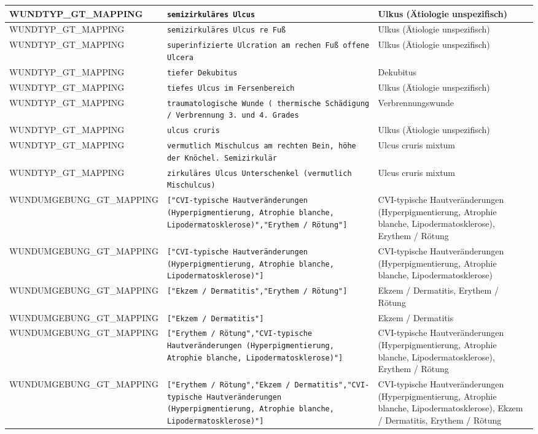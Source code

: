 \begin{longtable}{|p{3.5cm}|p{5cm}|p{6.5cm}|}
WUNDTYP\_GT\_MAPPING & \texttt{semizirkuläres Ulcus} & Ulkus (Ätiologie unspezifisch) \\ \hline
WUNDTYP\_GT\_MAPPING & \texttt{semizirkuläres Ulcus re Fuß} & Ulkus (Ätiologie unspezifisch) \\ \hline
WUNDTYP\_GT\_MAPPING & \texttt{superinfizierte Ulcration am rechen Fuß offene Ulcera} & Ulkus (Ätiologie unspezifisch) \\ \hline
WUNDTYP\_GT\_MAPPING & \texttt{tiefer Dekubitus} & Dekubitus \\ \hline
WUNDTYP\_GT\_MAPPING & \texttt{tiefes Ulcus im Fersenbereich} & Ulkus (Ätiologie unspezifisch) \\ \hline
WUNDTYP\_GT\_MAPPING & \texttt{traumatologische Wunde ( thermische Schädigung / Verbrennung 3. und 4. Grades} & Verbrennungswunde \\ \hline
WUNDTYP\_GT\_MAPPING & \texttt{ulcus cruris} & Ulkus (Ätiologie unspezifisch) \\ \hline
WUNDTYP\_GT\_MAPPING & \texttt{vermutlich Mischulcus am rechten Bein, höhe der Knöchel.
Semizirkulär} & Ulcus cruris mixtum \\ \hline
WUNDTYP\_GT\_MAPPING & \texttt{zirkuläres Ulcus Unterschenkel (vermutlich Mischulcus)} & Ulcus cruris mixtum \\ \hline
WUNDUMGEBUNG\_GT\_MAPPING & \texttt{["CVI-typische Hautveränderungen (Hyperpigmentierung, Atrophie blanche, Lipodermatosklerose)","Erythem / Rötung"]} & CVI-typische Hautveränderungen (Hyperpigmentierung, Atrophie blanche, Lipodermatosklerose), Erythem / Rötung \\ \hline
WUNDUMGEBUNG\_GT\_MAPPING & \texttt{["CVI-typische Hautveränderungen (Hyperpigmentierung, Atrophie blanche, Lipodermatosklerose)"]} & CVI-typische Hautveränderungen (Hyperpigmentierung, Atrophie blanche, Lipodermatosklerose) \\ \hline
WUNDUMGEBUNG\_GT\_MAPPING & \texttt{["Ekzem / Dermatitis","Erythem / Rötung"]} & Ekzem / Dermatitis, Erythem / Rötung \\ \hline
WUNDUMGEBUNG\_GT\_MAPPING & \texttt{["Ekzem / Dermatitis"]} & Ekzem / Dermatitis \\ \hline
WUNDUMGEBUNG\_GT\_MAPPING & \texttt{["Erythem / Rötung","CVI-typische Hautveränderungen (Hyperpigmentierung, Atrophie blanche, Lipodermatosklerose)"]} & CVI-typische Hautveränderungen (Hyperpigmentierung, Atrophie blanche, Lipodermatosklerose), Erythem / Rötung \\ \hline
WUNDUMGEBUNG\_GT\_MAPPING & \texttt{["Erythem / Rötung","Ekzem / Dermatitis","CVI-typische Hautveränderungen (Hyperpigmentierung, Atrophie blanche, Lipodermatosklerose)"]} & CVI-typische Hautveränderungen (Hyperpigmentierung, Atrophie blanche, Lipodermatosklerose), Ekzem / Dermatitis, Erythem / Rötung \\ \hline

\end{longtable}
